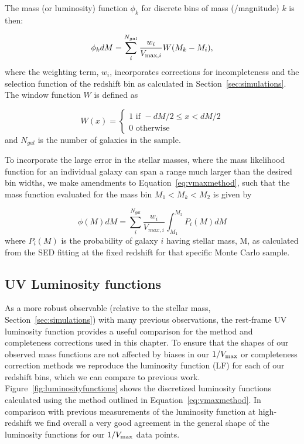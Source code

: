 The mass (or luminosity) function $\phi_{k}$ for discrete bins of mass (/magnitude) $k$ is then:

\begin{equation}\label{eq:vmaxmethod}
\phi_{k}dM = \sum_{i}^{N_{gal}} \frac{w_{i}}{V_{\textup{max},i}}W(M_{k}-M_{i}),
\end{equation}
where the weighting term, $w_{i}$, incorporates corrections for incompleteness and the selection function of the redshift bin as calculated in Section~\ref{sec:simulations}. The window function $W$ is defined as

\begin{equation}
W(x) = 
\begin{cases}
 1 \text{ if } -dM/2 \leq x < dM/2 \\ 
 0 \text{ otherwise }
\end{cases} 
\end{equation}
and $N_{gal}$ is the number of galaxies in the sample.

To incorporate the large error in the stellar masses, where the mass likelihood function for an individual galaxy can span a range much larger than the desired bin widths, we make amendments to Equation~\ref{eq:vmaxmethod}, such that the mass function evaluated for the mass bin $M_{1} < M_{k} < M_{2}$ is given by

\begin{equation}\label{eq:vmaxpdf}
\phi(M) dM = \sum_{i}^{N_{gal}}  \frac{w_{i}}{V_{max,i}} \int_{M_{1}}^{M_{2}} P_{i}(M)dM
\end{equation}
where $P_{i}(M)$ is the probability of galaxy $i$ having stellar mass, M, as calculated from the SED fitting at the fixed redshift for that specific Monte Carlo sample.

\subsection{UV Luminosity functions}
As a more robust observable (relative to the stellar mass, Section~\ref{sec:simulations}) with many previous observations, the rest-frame UV luminosity function provides a useful comparison for the method and completeness corrections used in this chapter. To ensure that the shapes of our observed mass functions are not affected by biases in our $1/V_{\rm{max}}$ or completeness correction methods we reproduce the luminosity function (LF) for each of our redshift bins, which we can compare to previous work. Figure~\ref{fig:luminosityfunctions} shows the discretized luminosity functions calculated using the method outlined in Equation~\ref{eq:vmaxmethod}. In comparison with previous measurements of the luminosity function at high-redshift we find overall a very good agreement in the general shape of the luminosity functions for our $1/V_{\rm{max}}$ data points.

